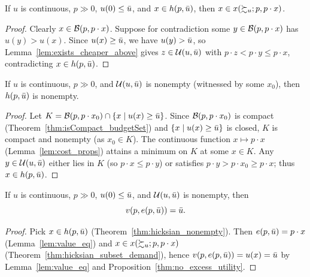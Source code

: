 \begin{theorem}
\label{thm:hicksian_subset_demand}
\leanok
{}
If $u$ is continuous, $p \gg 0$, $u(0) \le \bar{u}$, and $x \in h(p, \bar{u})$, then
$x \in x(\succsim_u; p, p \cdot x)$.
\end{theorem}
\begin{proof}
\leanok
Clearly $x \in \mathcal{B}(p, p \cdot x)$. Suppose for contradiction some $y \in \mathcal{B}(p, p \cdot x)$
has $u(y) > u(x)$. Since $u(x) \ge \bar{u}$, we have $u(y) > \bar{u}$, so
Lemma~\ref{lem:exists_cheaper_above} gives $z \in \mathcal{U}(u, \bar{u})$ with
$p \cdot z < p \cdot y \le p \cdot x$, contradicting $x \in h(p, \bar{u})$.
\end{proof}

\begin{theorem}
\label{thm:hicksian_nonempty}
\leanok
{}
If $u$ is continuous, $p \gg 0$, and $\mathcal{U}(u, \bar{u})$ is nonempty (witnessed by some $x_0$),
then $h(p, \bar{u})$ is nonempty.
\end{theorem}
\begin{proof}
\leanok
Let $K = \mathcal{B}(p, p \cdot x_0) \cap \{x \mid u(x) \ge \bar{u}\}$. Since $\mathcal{B}(p, p \cdot x_0)$ is
compact (Theorem~\ref{thm:isCompact_budgetSet}) and $\{x \mid u(x) \ge \bar{u}\}$ is closed,
$K$ is compact and nonempty (as $x_0 \in K$). The continuous function $x \mapsto p \cdot x$
(Lemma~\ref{lem:cost_props}) attains a minimum on $K$ at some $x \in K$. Any
$y \in \mathcal{U}(u, \bar{u})$ either lies in $K$ (so $p \cdot x \le p \cdot y$) or satisfies
$p \cdot y > p \cdot x_0 \ge p \cdot x$; thus $x \in h(p, \bar{u})$.
\end{proof}

\begin{theorem}[Duality identity $v(p, e(p, \ubar)) = \ubar$]
\label{thm:v_of_e}
\leanok
{}
If $u$ is continuous, $p \gg 0$, $u(0) \le \bar{u}$, and $\mathcal{U}(u, \bar{u})$ is nonempty, then
\[
  v(p, e(p, \bar{u})) = \bar{u}.
\]
\end{theorem}
\begin{proof}
\leanok
Pick $x \in h(p, \bar{u})$ (Theorem~\ref{thm:hicksian_nonempty}). Then $e(p, \bar{u}) = p \cdot x$
(Lemma~\ref{lem:value_eq}) and $x \in x(\succsim_u; p, p \cdot x)$
(Theorem~\ref{thm:hicksian_subset_demand}), hence
$v(p, e(p, \bar{u})) = u(x) = \bar{u}$ by Lemma~\ref{lem:value_eq} and
Proposition~\ref{thm:no_excess_utility}.
\end{proof}

